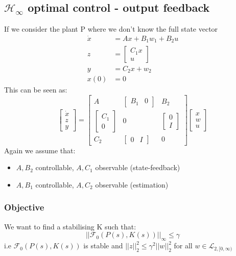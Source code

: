 \documentclass{article}
\begin{document}
\subsection{\texorpdfstring{$\mathcal{H}_\infty$}. optimal control - output feedback}
If we consider the plant P where we don't know the full state vector
\[
\begin{aligned}
    \dot x &= Ax + B_1 w_1 + B_2 u \\
    z &= \begin{bmatrix}
        C_1 x \\ u
    \end{bmatrix} \\
    y &= C_2 x + w_2 \\
    x(0) &= 0
\end{aligned}
\]
This can be seen as:
\[
\begin{bmatrix}
    \dot x \\ z \\ y
\end{bmatrix}
=
\begin{bmatrix}
    A & \begin{bmatrix}
        B_1 & 0
    \end{bmatrix} &
    B_2 \\
    \begin{bmatrix}
        C_1 \\ 0
    \end{bmatrix}
    & 0
    & \begin{bmatrix}
        0 \\ I
    \end{bmatrix} \\
    C_2 & \begin{bmatrix}
        0 & I
    \end{bmatrix} & 
    0 
\end{bmatrix}
\begin{bmatrix}
    x \\ w \\ u
\end{bmatrix}
\]
Again we assume that:
\begin{itemize}
    \item $A,B_2$ controllable, $A,C_1$ observable (state-feedback)
    \item $A,B_1$ controllable, $A,C_2$ observable (estimation)
\end{itemize}
\subsubsection*{Objective}
We want to find a stabilising K such that:
\[
||\mathcal{F_0}(P(s),K(s))||_\infty \leq \gamma
\]
i.e $\mathcal{F_0}(P(s),K(s))$ is stable and $||z||_2^2 \leq \gamma^2 ||w||_2^2$ for all $w \in \mathcal{L}_{2,[0,\infty)}$
\end{document}
